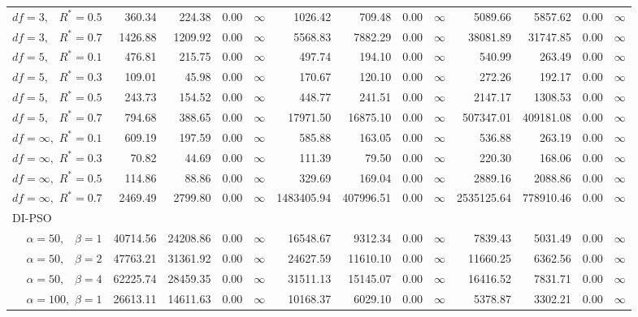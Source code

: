 \documentclass[cmbright]{staauth}
\begin{document}
\begin{table}[ht]
{\begin{tabular}{r|rrrr|rrrr|rrrr}
  $df = 3,\enspace$ $R^* =0.5$ & 360.34 & 224.38 & 0.00 & $\infty$ & 1026.42 & 709.48 & 0.00 & $\infty$ & 5089.66 & 5857.62 & 0.00 & $\infty$ \\
  $df = 3,\enspace$ $R^* =0.7$ & 1426.88 & 1209.92 & 0.00 & $\infty$ & 5568.83 & 7882.29 & 0.00 & $\infty$ & 38081.89 & 31747.85 & 0.00 & $\infty$ \\
  $df = 5,\enspace$ $R^* =0.1$ & 476.81 & 215.75 & 0.00 & $\infty$ & 497.74 & 194.10 & 0.00 & $\infty$ & 540.99 & 263.49 & 0.00 & $\infty$ \\
  $df = 5,\enspace$ $R^* =0.3$ & 109.01 & 45.98 & 0.00 & $\infty$ & 170.67 & 120.10 & 0.00 & $\infty$ & 272.26 & 192.17 & 0.00 & $\infty$ \\
  $df = 5,\enspace$ $R^* =0.5$ & 243.73 & 154.52 & 0.00 & $\infty$ & 448.77 & 241.51 & 0.00 & $\infty$ & 2147.17 & 1308.53 & 0.00 & $\infty$ \\
  $df = 5,\enspace$ $R^* =0.7$ & 794.68 & 388.65 & 0.00 & $\infty$ & 17971.50 & 16875.10 & 0.00 & $\infty$ & 507347.01 & 409181.08 & 0.00 & $\infty$ \\
  $df = \infty,$ $R^* =0.1$ & 609.19 & 197.59 & 0.00 & $\infty$ & 585.88 & 163.05 & 0.00 & $\infty$ & 536.88 & 263.19 & 0.00 & $\infty$ \\
  $df = \infty,$ $R^* =0.3$ & 70.82 & 44.69 & 0.00 & $\infty$ & 111.39 & 79.50 & 0.00 & $\infty$ & 220.30 & 168.06 & 0.00 & $\infty$ \\
  $df = \infty,$ $R^* =0.5$ & 114.86 & 88.86 & 0.00 & $\infty$ & 329.69 & 169.04 & 0.00 & $\infty$ & 2889.16 & 2088.86 & 0.00 & $\infty$ \\
  $df = \infty,$ $R^* =0.7$ & 2469.49 & 2799.80 & 0.00 & $\infty$ & 1483405.94 & 407996.51 & 0.00 & $\infty$ & 2535125.64 & 778910.46 & 0.00 & $\infty$ \\
\hline
\multicolumn{1}{l|}{DI-PSO} &&&&&&&&&&&&\\
  $\alpha = 50,\enspace$ $\beta =1$ & 40714.56 & 24208.86 & 0.00 & $\infty$ & 16548.67 & 9312.34 & 0.00 & $\infty$ & 7839.43 & 5031.49 & 0.00 & $\infty$ \\
  $\alpha = 50,\enspace$ $\beta =2$ & 47763.21 & 31361.92 & 0.00 & $\infty$ & 24627.59 & 11610.10 & 0.00 & $\infty$ & 11660.25 & 6362.56 & 0.00 & $\infty$ \\
  $\alpha = 50,\enspace$ $\beta =4$ & 62225.74 & 28459.35 & 0.00 & $\infty$ & 31511.13 & 15145.07 & 0.00 & $\infty$ & 16416.52 & 7831.71 & 0.00 & $\infty$ \\
  $\alpha = 100,$ $\beta =1$ & 26613.11 & 14611.63 & 0.00 & $\infty$ & 10168.37 & 6029.10 & 0.00 & $\infty$ & 5378.87 & 3302.21 & 0.00 & $\infty$ \\

\end{tabular}}
\end{table}
\end{document}

